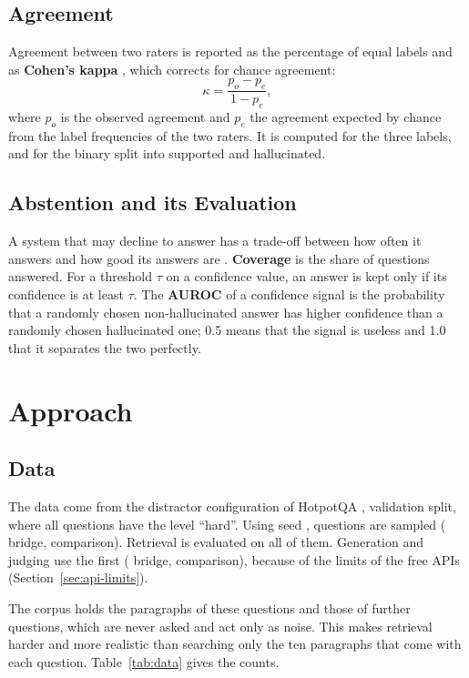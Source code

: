 \subsection{Agreement}
Agreement between two raters is reported as the percentage of equal labels and as \textbf{Cohen's
kappa} \cite{cohen1960kappa}, which corrects for chance agreement:
\begin{equation}
\kappa = \frac{p_o - p_e}{1 - p_e},
\end{equation}
where $p_o$ is the observed agreement and $p_e$ the agreement expected by chance from the label
frequencies of the two raters. It is computed for the three labels, and for the binary split into
supported and hallucinated.

\subsection{Abstention and its Evaluation}
A system that may decline to answer has a trade-off between how often it answers and how good its
answers are \cite{geifman2017selective}. \textbf{Coverage} is the share of questions answered. For a
threshold $\tau$ on a confidence value, an answer is kept only if its confidence is at least $\tau$.
The \textbf{AUROC} of a confidence signal is the probability that a randomly chosen non-hallucinated
answer has higher confidence than a randomly chosen hallucinated one; 0.5 means that the signal is
useless and 1.0 that it separates the two perfectly.

\section{Approach}\label{sec:approach}

\subsection{Data}
The data come from the distractor configuration of HotpotQA \cite{yang2018hotpotqa}, validation
split, where all questions have the level ``hard''. Using seed ,
 questions are sampled ( bridge, 
comparison). Retrieval is evaluated on all of them. Generation and judging use the first
 ( bridge,  comparison),
because of the limits of the free APIs (Section~\ref{sec:api-limits}).

The corpus holds the paragraphs of these  questions and those of
 further questions, which are never asked and act only as noise. This makes retrieval
harder and more realistic than searching only the ten paragraphs that come with each question.
Table~\ref{tab:data} gives the counts.


